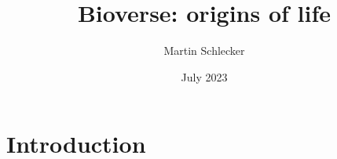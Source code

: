 \documentclass{article}
\title{Bioverse: origins of life}
\author{Martin Schlecker}
\date{July 2023}
\begin{document}
\maketitle

\section{Introduction}
\end{document}
